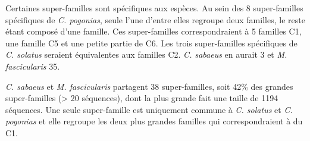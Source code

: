 \documentclass[12pt,a4paper]{article}
\begin{document}
	Certaines super-familles sont spécifiques aux espèces. Au sein des 8 super-familles spécifiques de \textit{C. pogonias}, seule l'une d'entre elles regroupe deux familles, le reste étant composé d'une famille. Ces super-familles correspondraient à 5 familles C1, une famille C5 et une petite partie de C6. Les trois super-familles spécifiques de \textit{C. solatus} seraient équivalentes aux familles C2.  \textit{C. sabaeus} en aurait 3 et  \textit{M. fascicularis} 35.
	
	\textit{C. sabaeus} et \textit{M. fascicularis} partagent 38 super-familles, soit 42\% des grandes super-familles (> 20 séquences), dont la plus grande fait une taille de 1194 séquences. Une seule super-famille est uniquement commune à \textit{C. solatus} et \textit{C. pogonias} et elle regroupe les deux plus grandes familles qui correspondraient à du C1.
	
\end{document}
